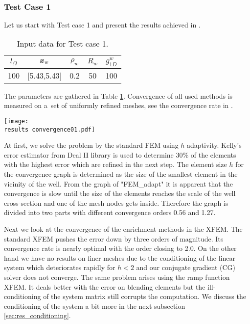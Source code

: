 \subsubsection{Test Case 1}
Let us start with Test case 1 and present the results achieved in \cite{exner_2016}.
%
\begin{table}[!htb]
\begin{center}
\begin{tabular}{ccccc}
\toprule
$l_\Omega$ & $\mathbf{\boldsymbol{x}}_w$  & $\rho_w$ & $R_w$ & $g^w_{1D}$\\
\midrule
100 & [5.43,5.43] & 0.2 & 50 & 100 \\
\bottomrule
\end{tabular}
\caption{Input data for Test case 1.}
\label{tab:test_case_1_data}
\end{center}
\end{table}
%
The parameters are gathered in Table \ref{tab:test_case_1_data}.
Convergence of all used methods is measured on a~set of uniformly refined meshes, 
see the convergence rate in .
%
\begin{graph}[!htb]
  \centering    
  \texttt{[image: \\results convergence01.pdf]}
  \caption[Convergence graph in Test case 1.]{Convergence of the $L^2$ norm of the approximation error in Test case 1.}
  \label{graph:convergence01}
\end{graph}
%
At first, we solve the problem by the standard FEM using $h$ adaptivity.
Kelly's error estimator from Deal II library is used to determine 30\% of the elements
with the highest error which are refined in the next step.
The element size $h$ for the convergence graph is determined as the size of the smallest element in the 
vicinity of the well.
From the graph of "FEM\_adapt" it is apparent that the convergence is slow until the size of the elements reaches the scale of the
well cross-section and one of the mesh nodes gets inside. 
Therefore the graph is divided into two parts with different convergence orders 0.56 and 1.27.

Next we look at the convergence of the enrichment methods in the XFEM.
The standard XFEM pushes the error down by three orders of magnitude. Its convergence rate is nearly optimal with the order closing to 2.0.
On the other hand we have no results on finer meshes due to the conditioning of the linear system
which deteriorates rapidly for $h<2$ and our conjugate gradient (CG) solver does not converge.
The same problem arises using the ramp function XFEM. It deals better with the error on blending elements but the
ill-conditioning of the system matrix still corrupts the computation. We discuss the conditioning of the system 
a bit more in the next subsection \ref{sec:res_conditioning}.

